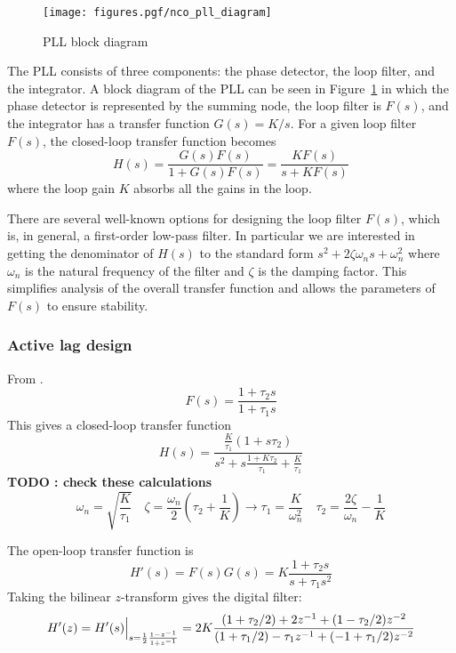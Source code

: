 \begin{figure}
\centering
  \texttt{[image: figures.pgf/nco\_pll\_diagram]}
\caption{PLL block diagram}
\label{fig:module:nco:pll_diagram}
\end{figure}

The PLL consists of three components: the phase detector, the loop filter, and
the integrator.
A block diagram of the PLL can be seen in
Figure~\ref{fig:module:nco:pll_diagram} in which the phase detector is
represented by the summing node, the loop filter is $F(s)$, and the integrator
has a transfer function $G(s) = K/s$.
For a given loop filter $F(s)$, the closed-loop transfer function becomes
\[
    H(s) = \frac{ G(s)F(s) }{ 1 + G(s)F(s) }
         = \frac{ KF(s)    }{ s + KF(s)    }
\]
where the loop gain $K$ absorbs all the gains in the loop.

There are several well-known options for designing the loop filter $F(s)$,
which is, in general, a first-order low-pass filter.
In particular we are interested in getting the denominator of $H(s)$ to the
standard form $s^2 + 2\zeta\omega_n s + \omega_n^2$ where $\omega_n$ is the
natural frequency of the filter and $\zeta$ is the damping factor.
This simplifies analysis of the overall transfer function and allows the
parameters of $F(s)$ to ensure stability.

\subsubsection{Active lag design}
From \cite{Best:1997}.
\[
    F(s) = \frac{1 + \tau_2 s}{1 + \tau_1 s}
\]
This gives a closed-loop transfer function
\[
    H(s) = \frac{
                \frac{K}{\tau_1} (1 + s\tau_2)
           } {
                s^2 + s\frac{1 + K\tau_2}{\tau_1} + \frac{K}{\tau_1}
           }
\]
{\bf TODO : check these calculations}
\[
    \omega_n = \sqrt{\frac{K}{\tau_1}}
    \,\,\,\,\,\,
    \zeta = \frac{\omega_n}{2}\left(\tau_2 + \frac{1}{K}\right)
        \rightarrow
    \tau_1 = \frac{K}{\omega_n^2}
    \,\,\,\,\,\,
    \tau_2 = \frac{2\zeta}{\omega_n} - \frac{1}{K}
\]

The open-loop transfer function is
\[
    H'(s) = F(s)G(s) = K \frac{1 + \tau_2 s}{s + \tau_1 s^2}
\]
Taking the bilinear $z$-transform gives the digital filter:
\[
    H'(z) = H'(s)\Bigl.\Bigr|_{s = \frac{1}{2}\frac{1-z^{-1}}{1+z^{-1}}}
          = 2 K \frac{
                (1+\tau_2/2) + 2 z^{-1}     + ( 1 - \tau_2/2)z^{-2}
          } {
                (1+\tau_1/2) -\tau_1 z^{-1} + (-1 + \tau_1/2)z^{-2}
          }
\]



